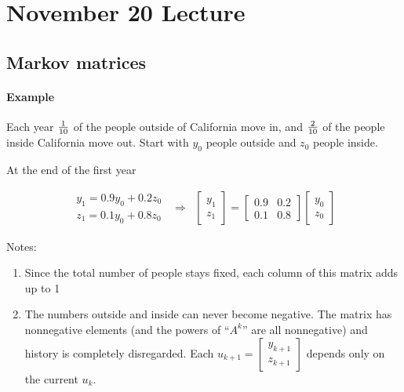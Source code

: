 \section{November 20 Lecture}

\subsection{Markov matrices}

\paragraph{Example} Each year ${1 \over 10}$ of the people outside of California move in, and ${2 \over 10}$ of the people inside California move out. Start with $y_0$ people outside and $z_0$ people inside.

At the end of the first year


\[
  \begin{matrix}
    \begin{matrix}
      y_1 = 0.9 y_0 + 0.2 z_0 \\
    z_1 = 0.1 y_0 + 0.8 z_0
    \end{matrix}
    & \Rightarrow &
    \begin{bmatrix}
      y_1 \\ z_1 
    \end{bmatrix}
    =
    \begin{bmatrix}
      0.9 & 0.2 \\ 0.1 & 0.8 
    \end{bmatrix}
    \begin{bmatrix}
      y_0 \\ z_0
    \end{bmatrix}
  \end{matrix}
\]

Notes:
\begin{enumerate}
  \item Since the total number of people stays fixed, each column of this matrix adds up to 1
  \item The numbers outside and inside can never become negative. The matrix has nonnegative elements (and the powers of ``$A^k$'' are all nonnegative) and history is completely disregarded. Each $u_{k+1} = \begin{bmatrix}
    y_{k+1} \\ z_{k+1}
  \end{bmatrix}$ depends only on the current $u_k$.
\end{enumerate}


